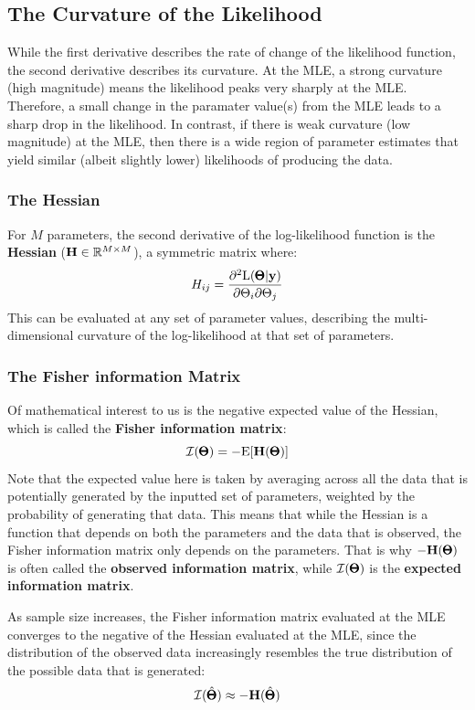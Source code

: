 \documentclass[12pt]{article}
\begin{document}
\subsection{The Curvature of the Likelihood}

While the first derivative describes the rate of change of the likelihood function, the second derivative describes its curvature.
At the MLE, a strong curvature (high magnitude) means the likelihood peaks very sharply at the MLE.
Therefore, a small change in the paramater value(s) from the MLE leads to a sharp drop in the likelihood.
In contrast, if there is weak curvature (low magnitude) at the MLE, then there is a wide region of parameter estimates that yield similar (albeit slightly lower) likelihoods of producing the data.

\subsubsection{The Hessian}
For $M$ parameters, the second derivative of the log-likelihood function is the \textbf{Hessian} ($\mathbf{H} \in \mathbb{R}^{M \times M}$), a symmetric matrix where:
$$
H_{ij} = \frac{ \partial^2 \mathrm{L}(\pmb{\Theta} | \mathbf{y})
    }{ \partial \Theta_i \partial \Theta_j}
$$
This can be evaluated at any set of parameter values, describing the multi-dimensional curvature of the log-likelihood at that set of parameters.

\subsubsection{The Fisher information Matrix}
Of mathematical interest to us is the negative expected value of the Hessian, which is called the \textbf{Fisher information matrix}:
$$ \mathcal{I}(\pmb{\Theta}) = - \mathrm{E}[ \mathbf{H} (\pmb{\Theta})] $$
Note that the expected value here is taken by averaging across all the data that is potentially generated by the inputted set of parameters, weighted by the probability of generating that data.
This means that while the Hessian is a function that depends on both the parameters and the data that is observed, the Fisher information matrix only depends on the parameters.
That is why $- \mathbf{H}(\pmb{\Theta})$ is often called the \textbf{observed information matrix}, while $\mathcal{I}(\pmb{\Theta})$ is the \textbf{expected information matrix}.

As sample size increases, the Fisher information matrix evaluated at the MLE converges to the negative of the Hessian evaluated at the MLE, since the distribution of the observed data increasingly resembles the true distribution of the possible data that is generated:
$$ \mathcal{I}(\hat{\pmb{\Theta}}) \approx -\mathbf{H}(\hat{\pmb{\Theta}}) $$
\end{document}
